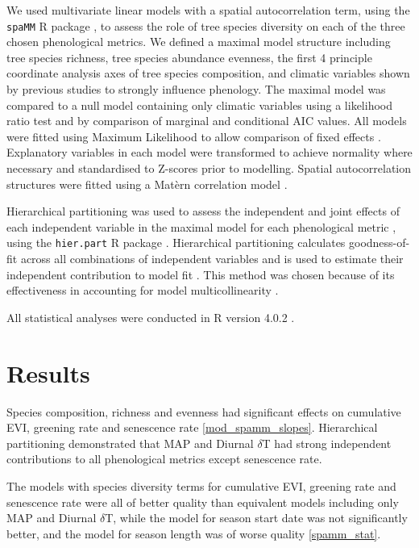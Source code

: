 \documentclass[11pt,a4paper]{article}
\begin{document}
We used multivariate linear models with a spatial autocorrelation term, using the \texttt{spaMM} R package \citep{spaMM2014}, to assess the role of tree species diversity on each of the three chosen phenological metrics. We defined a maximal model structure including tree species richness, tree species abundance evenness, the first 4 principle coordinate analysis axes of tree species composition, and climatic variables shown by previous studies to strongly influence phenology. The maximal model was compared to a null model containing only climatic variables using a likelihood ratio test and by comparison of marginal and conditional AIC values. All models were fitted using Maximum Likelihood to allow comparison of fixed effects \citep{}. Explanatory variables in each model were transformed to achieve normality where necessary and standardised to Z-scores prior to modelling. Spatial autocorrelation structures were fitted using a Mat\`{e}rn correlation model \citep{}.

Hierarchical partitioning was used to assess the independent and joint effects of each independent variable in the maximal model for each phenological metric \citep{Chevan1991, MacNally2002}, using the \texttt{hier.part} R package \citep{hier.part2004}. Hierarchical partitioning calculates goodness-of-fit across all combinations of independent variables \citep{Walsh2013} and is used to estimate their independent contribution to model fit \citep{MacNally2002}. This method was chosen because of its effectiveness in accounting for model multicollinearity \citep{Olea2010}. 

All statistical analyses were conducted in R version 4.0.2 \citep{R2020}.

\section{Results}

Species composition, richness and evenness had significant effects on cumulative EVI, greening rate and senescence rate \autoref{mod_spamm_slopes}. Hierarchical partitioning demonstrated that MAP and Diurnal $\delta$T had strong independent contributions to all phenological metrics except senescence rate. 

The models with species diversity terms for cumulative EVI, greening rate and senescence rate were all of better quality than equivalent models including only MAP and Diurnal $\delta$T, while the model for season start date was not significantly better, and the model for season length was of worse quality \autoref{spamm_stat}. 
\end{document}
